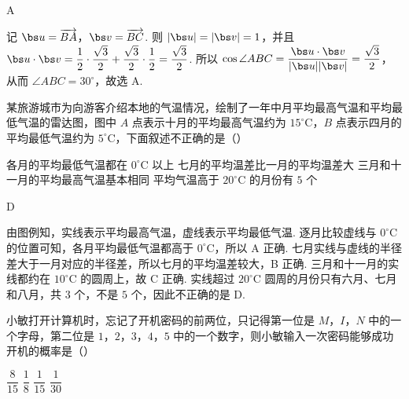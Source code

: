 \begin{answer}
A
\end{answer}

\begin{solution}
记 \(\bs u=\overrightarrow{BA}\)，\(\bs v=\overrightarrow{BC}\). 则 \(|\bs u|=|\bs v|=1\)，并且 \(\bs u\cdot\bs v=\dfrac12\cdot\dfrac{\sqrt3}{2}+\dfrac{\sqrt3}{2}\cdot\dfrac12=\dfrac{\sqrt3}{2}\). 所以 \(\cos\angle ABC=\dfrac{\bs u\cdot\bs v}{|\bs u||\bs v|}=\dfrac{\sqrt3}{2}\)，从而 \(\angle ABC=30^\circ\)，故选 A.
\end{solution}

\begin{problem}
某旅游城市为向游客介绍本地的气温情况，绘制了一年中月平均最高气温和平均最低气温的雷达图，图中 \(A\) 点表示十月的平均最高气温约为 \(15^\circ\mathrm{C}\)，\(B\) 点表示四月的平均最低气温约为 \(5^\circ\mathrm{C}\)，下面叙述不正确的是（\quad）

\begingroup
{}
\endgroup

\choices
    {各月的平均最低气温都在 \(0^\circ\mathrm{C}\) 以上}
    {七月的平均温差比一月的平均温差大}
    {三月和十一月的平均最高气温基本相同}
    {平均气温高于 \(20^\circ\mathrm{C}\) 的月份有 \(5\) 个}
\end{problem}

\begin{answer}
D
\end{answer}

\begin{solution}
由图例知，实线表示平均最高气温，虚线表示平均最低气温. 逐月比较虚线与 \(0^\circ\mathrm{C}\) 的位置可知，各月平均最低气温都高于 \(0^\circ\mathrm{C}\)，所以 A 正确. 七月实线与虚线的半径差大于一月对应的半径差，所以七月的平均温差较大，B 正确. 三月和十一月的实线都约在 \(10^\circ\mathrm{C}\) 的圆周上，故 C 正确. 实线超过 \(20^\circ\mathrm{C}\) 圆周的月份只有六月、七月和八月，共 \(3\) 个，不是 \(5\) 个，因此不正确的是 D.
\end{solution}

\begin{problem}
小敏打开计算机时，忘记了开机密码的前两位，只记得第一位是 \(M\)，\(I\)，\(N\) 中的一个字母，第二位是 \(1\)，\(2\)，\(3\)，\(4\)，\(5\) 中的一个数字，则小敏输入一次密码能够成功开机的概率是（\quad）

\choices
    {\(\dfrac{8}{15}\)}
    {\(\dfrac18\)}
    {\(\dfrac{1}{15}\)}
    {\(\dfrac{1}{30}\)}
\end{problem}

